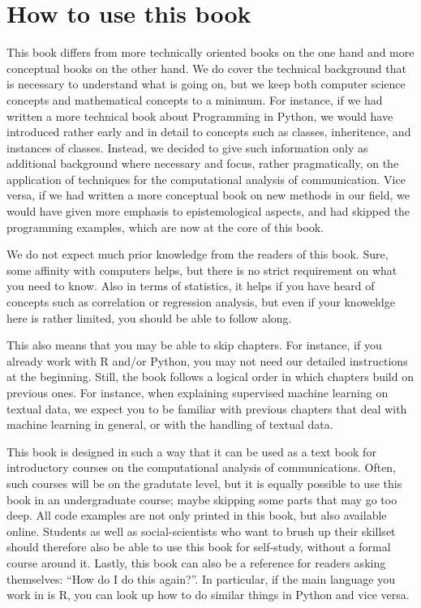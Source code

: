 
\section{How to use this book}

This book differs from more technically oriented books on the one hand
and more conceptual books on the other hand. We do cover the technical
background that is necessary to understand what is going on, but we
keep both computer science concepts and mathematical concepts to a
minimum. For instance, if we had written a more technical book about
Programming in Python, we would have introduced rather early and in
detail to concepts such as classes, inheritence, and instances of
classes. Instead, we decided to give such information only as
additional background where necessary and focus, rather pragmatically,
on the application of techniques for the computational analysis of
communication. Vice versa, if we had written a more conceptual book on
new methods in our field, we would have given more emphasis to
epistemological aspects, and had skipped the programming examples,
which are now at the core of this book.

We do not expect much prior knowledge from the readers of this
book. Sure, some affinity with computers helps, but there is no strict
requirement on what you need to know. Also in terms of statistics, it
helps if you have heard of concepts such as correlation or
regression analysis, but even if your knoweldge here is rather
limited, you should be able to follow along.

This also means that you may be able to skip chapters. For instance,
if you already work with R and/or Python, you may not need our
detailed instructions at the beginning. Still, the book follows a
logical order in which chapters build on previous ones. For instance,
when explaining supervised machine learning on textual data, we expect
you to be familiar with previous chapters that deal with machine
learning in general, or with the handling of textual data.

This book is designed in such a way that it can be used as a text book
for introductory courses on the computational analysis of
communications. Often, such courses will be on the gradutate level,
but it is equally possible to use this book in an undergraduate
course; maybe skipping some parts that may go too deep. All code
examples are not only printed in this book, but also available
online. Students as well as social-scientists who want to brush up
their skillset should therefore also be able to use this book for
self-study, without a formal course around it. Lastly, this book can
also be a reference for readers asking themselves: ``How do I 
do this again?''. In particular, if the main language you work in is
R, you can look up how to do similar things in Python and vice versa.


